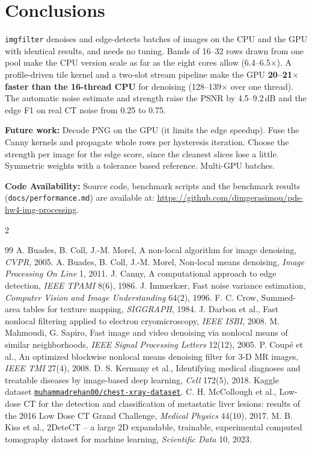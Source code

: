 \documentclass[10pt,a4paper]{article}
\begin{document}
\section{Conclusions}
\texttt{imgfilter} denoises and edge-detects batches of images on the CPU and the GPU with identical results, and needs no tuning.
Bands of 16--32 rows drawn from one pool make the CPU version scale as far as the eight cores allow (6.4--6.5$\times$).
A profile-driven tile kernel and a two-slot stream pipeline make the GPU \textbf{20--21$\times$ faster than the 16-thread CPU} for
denoising (128--139$\times$ over one thread). The automatic noise estimate and strength raise the PSNR by 4.5--9.2\,dB and the edge
F1 on real CT noise from 0.25 to 0.75.

\textbf{Future work:} Decode PNG on the GPU (it limits the edge speedup). Fuse the Canny kernels and propagate whole rows per
hysteresis iteration. Choose the strength per image for the edge score, since the cleanest slices lose a little. Symmetric weights
with a tolerance based reference. Multi-GPU batches.

\textbf{Code Availability:} Source code, benchmark scripts and the benchmark results (\texttt{docs/performance.md}) are available at:
\url{https://github.com/dimgerasimou/pds-hw4-img-processing}.

\begin{multicols}{2}
\begin{thebibliography}{99}\footnotesize\setlength{\itemsep}{0pt}\setlength{\parskip}{0pt}
 A. Buades, B. Coll, J.-M. Morel, A non-local algorithm for image denoising, \emph{CVPR}, 2005.
 A. Buades, B. Coll, J.-M. Morel, Non-local means denoising, \emph{Image Processing On Line} 1, 2011.
 J. Canny, A computational approach to edge detection, \emph{IEEE TPAMI} 8(6), 1986.
 J. Immerk{\ae}r, Fast noise variance estimation, \emph{Computer Vision and Image Understanding} 64(2), 1996.
 F. C. Crow, Summed-area tables for texture mapping, \emph{SIGGRAPH}, 1984.
 J. Darbon et al., Fast nonlocal filtering applied to electron cryomicroscopy, \emph{IEEE ISBI}, 2008.
 M. Mahmoudi, G. Sapiro, Fast image and video denoising via nonlocal means of similar neighborhoods, \emph{IEEE Signal Processing Letters} 12(12), 2005.
 P. Coup\'e et al., An optimized blockwise nonlocal means denoising filter for 3-D MR images, \emph{IEEE TMI} 27(4), 2008.
 D. S. Kermany et al., Identifying medical diagnoses and treatable diseases by image-based deep learning, \emph{Cell} 172(5), 2018.
 Kaggle dataset \href{https://www.kaggle.com/datasets/muhammadrehan00/chest-xray-dataset}{\texttt{muhammadrehan00/chest-xray-dataset}}.
 C. H. McCollough et al., Low-dose CT for the detection and classification of metastatic liver lesions: results of the 2016 Low Dose CT Grand Challenge, \emph{Medical Physics} 44(10), 2017.
 M. B. Kiss et al., 2DeteCT -- a large 2D expandable, trainable, experimental computed tomography dataset for machine learning, \emph{Scientific Data} 10, 2023.
\end{thebibliography}
\end{multicols}
\end{document}
